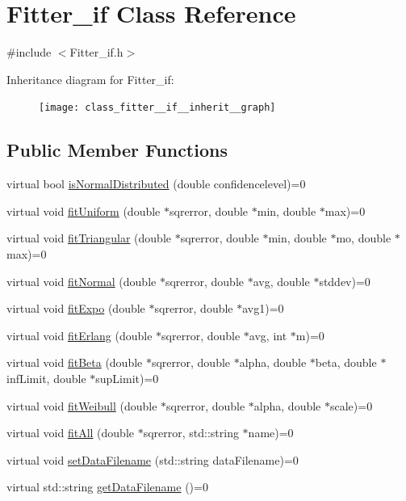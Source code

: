 \hypertarget{class_fitter__if}{\section{Fitter\-\_\-if Class Reference}
\label{class_fitter__if}
}


{\ttfamily \#include $<$Fitter\-\_\-if.\-h$>$}



Inheritance diagram for Fitter\-\_\-if\-:\nopagebreak
\begin{figure}[H]
\begin{center}
\leavevmode
\texttt{[image: class\_fitter\_\_if\_\_inherit\_\_graph]}
\end{center}
\end{figure}
\subsection*{Public Member Functions}
\begin{DoxyCompactItemize}
\item 
virtual bool \hyperlink{class_fitter__if_a53e98635fcdee314e8ade8089f41ddad}{is\-Normal\-Distributed} (double confidencelevel)=0
\item 
virtual void \hyperlink{class_fitter__if_adec53dfede4bdb31b175e57e6a2c2fc7}{fit\-Uniform} (double $\ast$sqrerror, double $\ast$min, double $\ast$max)=0
\item 
virtual void \hyperlink{class_fitter__if_a2bfc41c6a8044520aeafb2c5c71fe570}{fit\-Triangular} (double $\ast$sqrerror, double $\ast$min, double $\ast$mo, double $\ast$max)=0
\item 
virtual void \hyperlink{class_fitter__if_af95b4de00b7ed5d67b10d9ee458379bf}{fit\-Normal} (double $\ast$sqrerror, double $\ast$avg, double $\ast$stddev)=0
\item 
virtual void \hyperlink{class_fitter__if_a5ab5ac575b736bb720e6a40b334de5a3}{fit\-Expo} (double $\ast$sqrerror, double $\ast$avg1)=0
\item 
virtual void \hyperlink{class_fitter__if_aead0c465573cdd42e63e2b175c0bc929}{fit\-Erlang} (double $\ast$sqrerror, double $\ast$avg, int $\ast$m)=0
\item 
virtual void \hyperlink{class_fitter__if_a8ea1e6520f191368274fec5ab8e5f182}{fit\-Beta} (double $\ast$sqrerror, double $\ast$alpha, double $\ast$beta, double $\ast$inf\-Limit, double $\ast$sup\-Limit)=0
\item 
virtual void \hyperlink{class_fitter__if_a40c5bc2e953e683751743cf06df077c6}{fit\-Weibull} (double $\ast$sqrerror, double $\ast$alpha, double $\ast$scale)=0
\item 
virtual void \hyperlink{class_fitter__if_a819a5ca8715ba4be30d2c7a3957aa467}{fit\-All} (double $\ast$sqrerror, std\-::string $\ast$name)=0
\item 
virtual void \hyperlink{class_fitter__if_aa2d2f13548a09a2f727a4190a6b9c2dd}{set\-Data\-Filename} (std\-::string data\-Filename)=0
\item 
virtual std\-::string \hyperlink{class_fitter__if_a3c6926020b1224a960890fe308abcc86}{get\-Data\-Filename} ()=0
\end{DoxyCompactItemize}



